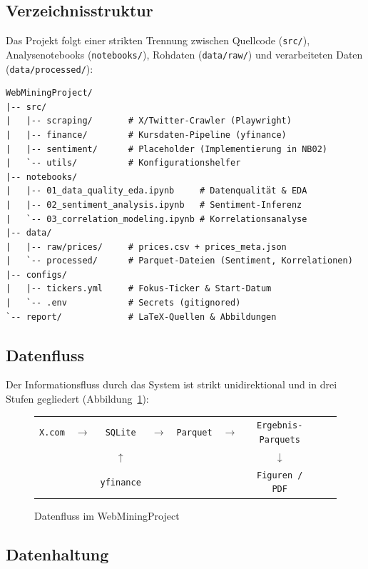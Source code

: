 \documentclass[11pt, a4paper]{article}
\begin{document}
\subsection{Verzeichnisstruktur}

Das Projekt folgt einer strikten Trennung zwischen Quellcode (\texttt{src/}),
Analysenotebooks (\texttt{notebooks/}), Rohdaten (\texttt{data/raw/}) und
verarbeiteten Daten (\texttt{data/processed/}):

\begin{lstlisting}[language={}, caption={Projektstruktur}]
WebMiningProject/
|-- src/
|   |-- scraping/       # X/Twitter-Crawler (Playwright)
|   |-- finance/        # Kursdaten-Pipeline (yfinance)
|   |-- sentiment/      # Placeholder (Implementierung in NB02)
|   `-- utils/          # Konfigurationshelfer
|-- notebooks/
|   |-- 01_data_quality_eda.ipynb     # Datenqualität & EDA
|   |-- 02_sentiment_analysis.ipynb   # Sentiment-Inferenz
|   `-- 03_correlation_modeling.ipynb # Korrelationsanalyse
|-- data/
|   |-- raw/prices/     # prices.csv + prices_meta.json
|   `-- processed/      # Parquet-Dateien (Sentiment, Korrelationen)
|-- configs/
|   |-- tickers.yml     # Fokus-Ticker & Start-Datum
|   `-- .env            # Secrets (gitignored)
`-- report/             # LaTeX-Quellen & Abbildungen
\end{lstlisting}

\subsection{Datenfluss}

Der Informationsfluss durch das System ist strikt unidirektional und in drei
Stufen gegliedert (Abbildung~\ref{fig:datenfluss}):

\begin{figure}[H]
\centering
\begin{tabular}{ccccccccc}
\texttt{X.com} & $\longrightarrow$ & \texttt{SQLite} & $\longrightarrow$ &
\texttt{Parquet} & $\longrightarrow$ & \texttt{Ergebnis-Parquets} \\
& & $\uparrow$ & & & & $\downarrow$ \\
& & \texttt{yfinance} & & & & \texttt{Figuren / PDF}\\
\end{tabular}
\caption{Datenfluss im WebMiningProject}
\label{fig:datenfluss}
\end{figure}

\subsection{Datenhaltung}
\end{document}
